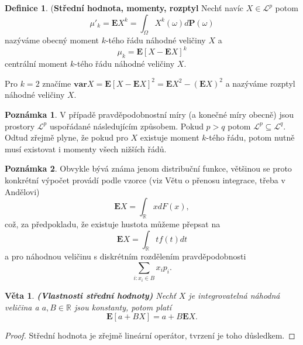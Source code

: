 \documentclass[a4]{report}
\newtheorem{theorem}{Věta}
\theoremstyle{definition}
\newtheorem{definition}{Definice}[section]
\newtheorem{remark}{Poznámka}[section]
\begin{document}
{\begin{definition}{(\textbf{Střední hodnota, momenty, rozptyl}}
Nechť navíc $X \in \mathcal{L}^{p}$ potom 
\begin{equation}
\mu'_{k}=\textbf{E}X^{k}=\int_{\Omega}X^{k}(\omega) d\textbf{P}(\omega) 
\end{equation}
nazýváme obecný moment $k$-tého řádu náhodné veličiny $X$ a 
\begin{equation}
\mu_{k} = \mathbf{E}[X - \mathbf{E}X]^{k}
\end{equation}
centrální moment $k$-tého řádu náhodné veličiny $X$.

Pro $k = 2$ značíme $\mathbf{var}X = \mathbf{E}[X - \mathbf{E}X]^{2} = \mathbf{E}X^{2} - (\mathbf{E}X)^{2}$ a nazýváme rozptyl náhodné veličiny $X$.
\end{definition}
\begin{remark}
V případě pravděpodobnostní míry (a konečné míry obecně) jsou prostory $\mathcal{L}^{p}$ uspořádané následujícím způsobem. Pokud $p > q$ potom $\mathcal{L}^{p} \subseteq \mathcal{L}^{q}$. Odtud zřejmě plyne, že pokud pro $X$ existuje moment $k$-tého řádu, potom nutně musí existovat i momenty všech nižších řádů.
\end{remark}
\begin{remark}
Obvykle bývá známa jenom distribuční funkce, většinou se proto konkrétní výpočet provádí podle vzorce (viz Větu o přenosu integrace, třeba v Andělovi) 
\begin{equation}
\mathbf{E}X = \int_{\mathbb{R}}xdF(x),
\end{equation}
což, za předpokladu, že existuje hustota můžeme přepsat na
\begin{equation}
\mathbf{E}X = \int_{\mathbb{R}}tf(t)dt
\end{equation}
a pro náhodnou veličinu s diskrétním rozdělením pravděpodobnosti
\begin{equation}
\sum_{i: x_{i}\in B}x_{i}p_{i}.
\end{equation}
\end{remark}

\begin{theorem}{\textbf{(Vlastnosti střední hodnoty)}}
Nechť $X$ je integrovatelná náhodná veličina a $a, B \in \mathbb{R}$ jsou konstanty, potom platí
\begin{equation}
\mathbf{E}[a + BX] = a + B\mathbf{E}X.
\end{equation}
\end{theorem}
\begin{proof}
Střední hodnota je zřejmě lineární operátor, tvrzení je toho důsledkem.
\end{proof}

}
\end{document}
